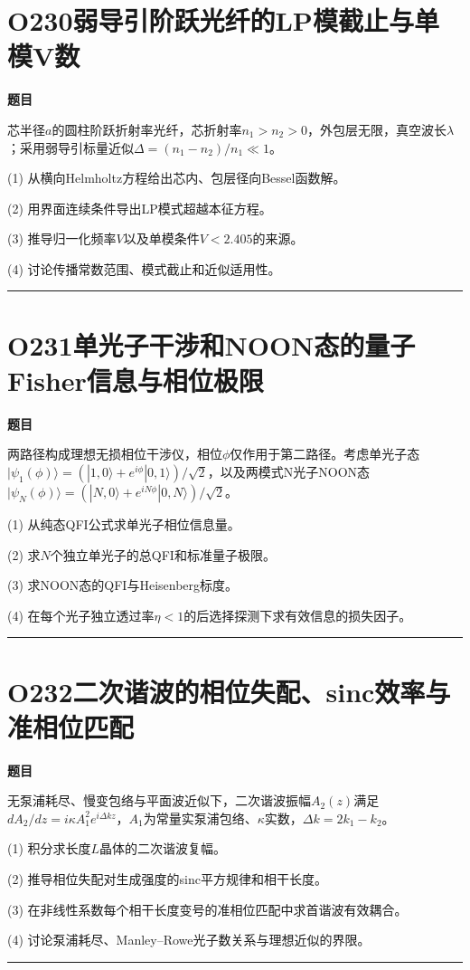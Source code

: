 \documentclass[UTF8,a4paper,11pt,oneside,openany]{ctexbook}
\begin{document}
\section*{O230\quad 弱导引阶跃光纤的LP模截止与单模V数}
\textbf{题目}\par
芯半径$a$的圆柱阶跃折射率光纤，芯折射率$n_1>n_2>0$，外包层无限，真空波长$\lambda$；采用弱导引标量近似$\Delta=(n_1-n_2)/n_1\ll1$。
\par\smallskip\noindent (1) 从横向Helmholtz方程给出芯内、包层径向Bessel函数解。
\par\smallskip\noindent (2) 用界面连续条件导出LP模式超越本征方程。
\par\smallskip\noindent (3) 推导归一化频率$V$以及单模条件$V<2.405$的来源。
\par\smallskip\noindent (4) 讨论传播常数范围、模式截止和近似适用性。
\par\medskip\hrule\medskip
\section*{O231\quad 单光子干涉和NOON态的量子Fisher信息与相位极限}
\textbf{题目}\par
两路径构成理想无损相位干涉仪，相位$\phi$仅作用于第二路径。考虑单光子态$|\psi_1(\phi)\rangle=(|1,0\rangle+e^{i\phi}|0,1\rangle)/\sqrt2$，以及两模式N光子NOON态$|\psi_N(\phi)\rangle=(|N,0\rangle+e^{iN\phi}|0,N\rangle)/\sqrt2$。
\par\smallskip\noindent (1) 从纯态QFI公式求单光子相位信息量。
\par\smallskip\noindent (2) 求$N$个独立单光子的总QFI和标准量子极限。
\par\smallskip\noindent (3) 求NOON态的QFI与Heisenberg标度。
\par\smallskip\noindent (4) 在每个光子独立透过率$\eta<1$的后选择探测下求有效信息的损失因子。
\par\medskip\hrule\medskip
\section*{O232\quad 二次谐波的相位失配、sinc效率与准相位匹配}
\textbf{题目}\par
无泵浦耗尽、慢变包络与平面波近似下，二次谐波振幅$A_2(z)$满足$dA_2/dz=i\kappa A_1^2 e^{i\Delta k z}$，$A_1$为常量实泵浦包络、$\kappa$实数，$\Delta k=2k_1-k_2$。
\par\smallskip\noindent (1) 积分求长度$L$晶体的二次谐波复幅。
\par\smallskip\noindent (2) 推导相位失配对生成强度的sinc平方规律和相干长度。
\par\smallskip\noindent (3) 在非线性系数每个相干长度变号的准相位匹配中求首谐波有效耦合。
\par\smallskip\noindent (4) 讨论泵浦耗尽、Manley–Rowe光子数关系与理想近似的界限。
\par\medskip\hrule\medskip
\end{document}
